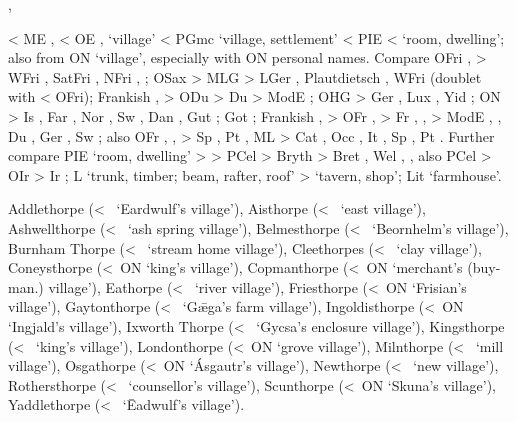 \documentclass[12pt,letterpaper,oneside,article,draft]{memoir}
\begin{document}
\begin{Lemma}
\begin{Also}
	, 
\end{Also}
\begin{Etymology}
	< ME ,  < OE ,  ‘village’ < PGmc  ‘village, settlement’
		< PIE  <  ‘room, dwelling’; also from ON  ‘village’,
		especially with ON personal names.
	Compare
	OFri ,  > WFri , SatFri , NFri , ;
	OSax  > MLG  > LGer , Plautdietsch , WFri 
		(doublet with  < OFri);
	Frankish ,  > ODu  > Du  > ModE ;
	OHG  > Ger , Lux , Yid  ;
	ON  > Is , Far , Nor , Sw , Dan , Gut ;
	Got  ;
	Frankish ,  > OFr ,  >
			Fr , ,  > ModE , ,
			Du , Ger , Sw ;
		also OFr , ,  > Sp , Pt , ML  >
			Cat , Occ , It , Sp \fm{tropa}, Pt .
	Further compare PIE  ‘room, dwelling’ >  >
			PCel  > Bryth  > Bret , Wel , ,
			also PCel  > OIr  > Ir ;
		L  ‘trunk, timber; beam, rafter, roof’ >  ‘tavern, shop’;
		Lit  ‘farmhouse’.
\end{Etymology}
\begin{Definitions}
\end{Definitions}
\begin{Examples}
	Addlethorpe (<~ ‘Eardwulf’s village’), Aisthorpe (<~ ‘east village’), Ashwellthorpe (<~ ‘ash spring village’), Belmesthorpe (<~ ‘Beornhelm’s village’), Burnham Thorpe (<~ ‘stream home village’), Cleethorpes (<~ ‘clay village’), Coneysthorpe (<~ON  ‘king’s village’), Copmanthorpe (<~ON  ‘merchant’s (buy-man.) village’), Eathorpe (<~ ‘river village’), Friesthorpe (<~ON  ‘Frisian’s village’), Gaytonthorpe (<~ ‘Gǣga’s farm village’), Ingoldisthorpe (<~ON  ‘Ingjald’s village’), Ixworth Thorpe (<~ ‘Gycsa’s enclosure village’), Kingsthorpe (<~ ‘king’s village’), Londonthorpe (<~ON  ‘grove village’), Milnthorpe (<~ ‘mill village’), Osgathorpe (<~ON  ‘Ásgautr’s village’), Newthorpe (<~ ‘new village’), Rothersthorpe (<~ ‘counsellor’s village’), Scunthorpe (<~ON  ‘Skuna’s village’), Yaddlethorpe (<~ ‘Ēadwulf’s village’).
\end{Examples}
\end{Lemma}
\end{document}
